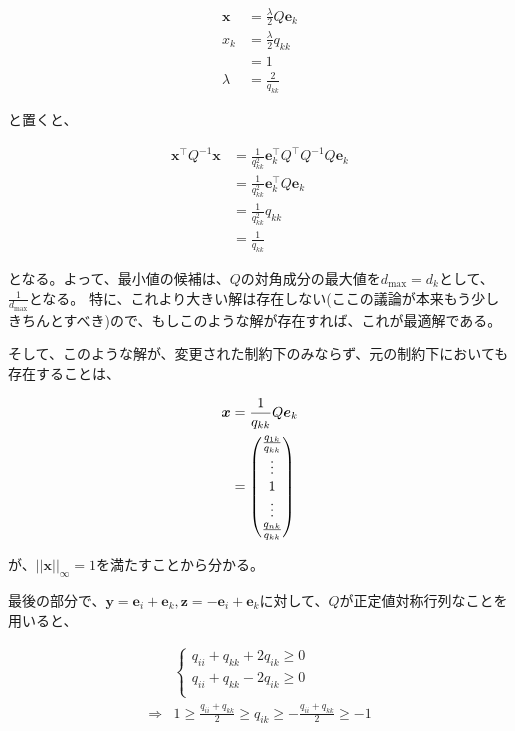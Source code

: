 \documentclass[a4paper, 10pt, dvipdfmx]{jlreq}
\begin{document}
\begin{align*}
  \bm{x}  & =\frac{\lambda}{2}Q\bm{e}_k \\
  x_k     & =\frac{\lambda}{2}q_{kk}    \\
          & =1                          \\
  \lambda & =\frac{2}{q_{kk}}
\end{align*}

と置くと、

\begin{align*}
  \bm{x}^\top Q^{-1}\bm{x} & =\frac{1}{q_{kk}^2}\bm{e}_k^\top Q^\top Q^{-1}Q\bm{e}_k \\
                           & =\frac{1}{q_{kk}^2}\bm{e}_k^\top Q\bm{e}_k              \\
                           & =\frac{1}{q_{kk}^2}q_{kk}                               \\
                           & =\frac{1}{q_{kk}}
\end{align*}

となる。よって、最小値の候補は、$Q$の対角成分の最大値を$d_{\text{max}}=d_k$として、$\frac{1}{d_{\text{max}}}$となる。
特に、これより大きい解は存在しない(ここの議論が本来もう少しきちんとすべき)ので、もしこのような解が存在すれば、これが最適解である。

そして、このような解が、変更された制約下のみならず、元の制約下においても存在することは、

\begin{align*}
  \bm{x} & =\frac{1}{q_{kk}}Q\bm{e}_k   \\
         & =\mqty(\frac{q_{1k}}{q_{kk}} \\ \vdots \\ 1 \\ \vdots \\ \frac{q_{nk}}{q_{kk}})
\end{align*}

が、$||\bm{x}||_\infty=1$を満たすことから分かる。

最後の部分で、$\bm{y}=\bm{e}_i+\bm{e}_k,\bm{z}=-\bm{e}_i+\bm{e}_k$に対して、$Q$が正定値対称行列なことを用いると、

\begin{align*}
              & \begin{cases}
                  q_{ii}+q_{kk}+2q_{ik} \geq 0 \\
                  q_{ii}+q_{kk}-2q_{ik} \geq 0 \\
                \end{cases}                                                      \\
  \Rightarrow & 1 \geq \frac{q_{ii}+q_{kk}}{2} \geq  q_{ik} \geq -\frac{q_{ii}+q_{kk}}{2} \geq -1
\end{align*}
\end{document}
